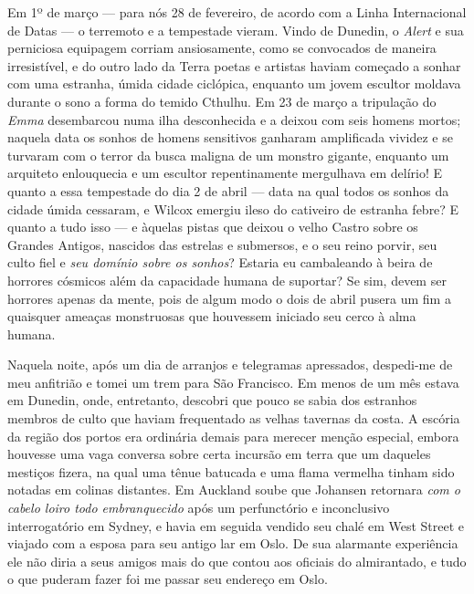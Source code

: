Em 1º de março --- para nós 28 de fevereiro, de
acordo com a Linha Internacional de Datas --- o terremoto e a tempestade
vieram. Vindo de Dunedin, o \emph{Alert} e sua perniciosa equipagem
corriam ansiosamente, como se convocados de maneira irresistível, e do
outro lado da Terra poetas e artistas haviam começado a sonhar com uma
estranha, úmida cidade ciclópica, enquanto um jovem escultor moldava
durante o sono a forma do temido Cthulhu. Em 23 de março a tripulação do
\emph{Emma} desembarcou numa ilha desconhecida e a deixou com seis
homens mortos; naquela data os sonhos de homens sensitivos ganharam
amplificada vividez e se turvaram com o terror da busca maligna de um
monstro gigante, enquanto um arquiteto enlouquecia e um escultor
repentinamente mergulhava em delírio! E quanto a essa tempestade do dia
2 de abril --- data na qual todos os sonhos da cidade úmida cessaram, e
Wilcox emergiu ileso do cativeiro de estranha febre? E quanto a tudo
isso --- e àquelas pistas que deixou o velho Castro sobre os Grandes
Antigos, nascidos das estrelas e submersos, e o seu reino porvir, seu
culto fiel e \emph{seu domínio sobre os sonhos}? Estaria eu cambaleando
à beira de horrores cósmicos além da capacidade humana de suportar? Se
sim, devem ser horrores apenas da mente, pois de algum modo o dois de
abril pusera um fim a quaisquer ameaças monstruosas que houvessem
iniciado seu cerco à alma humana.

Naquela noite, após um dia de arranjos e telegramas apressados,
despedi-me de meu anfitrião e tomei um trem para São Francisco. Em menos
de um mês estava em Dunedin, onde, entretanto, descobri que pouco se
sabia dos estranhos membros de culto que haviam frequentado as velhas
tavernas da costa. A escória da região dos portos era ordinária demais
para merecer menção especial, embora houvesse uma vaga conversa sobre
certa incursão em terra que um daqueles mestiços fizera, na qual uma
tênue batucada e uma flama vermelha tinham sido notadas em colinas
distantes. Em Auckland soube que Johansen retornara \emph{com o cabelo
loiro todo embranquecido} após um perfunctório e inconclusivo
interrogatório em Sydney, e havia em seguida vendido seu chalé em West
Street e viajado com a esposa para seu antigo lar em Oslo. De sua
alarmante experiência ele não diria a seus amigos mais do que contou aos
oficiais do almirantado, e tudo o que puderam fazer foi me passar seu
endereço em Oslo.

